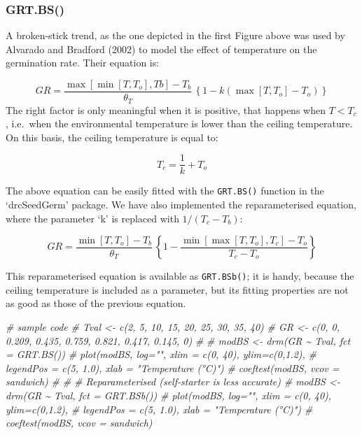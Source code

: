 \documentclass[
]{book}
\newenvironment{Shaded}{\begin{snugshade}}{\end{snugshade}}
\newcommand{\CommentTok}[1]{\textcolor[rgb]{0.56,0.35,0.01}{\textit{#1}}}
\begin{document}
\hypertarget{grt.bs}{%
\subsubsection{GRT.BS()}\label{grt.bs}}

A broken-stick trend, as the one depicted in the first Figure above was used by Alvarado and Bradford (2002) to model the effect of temperature on the germination rate. Their equation is:

\[GR = \frac{\max \left[\min \left[T,T_o \right], Tb \right] - T_b}{\theta_{T}} \, \left\{ 1 - k \left( \max \left[ T,T_o \right] - T_o \right) \right\}\]
The right factor is only meaningful when it is positive, that happens when \(T < T_c\), i.e.~when the environmental temperature is lower than the ceiling temperature. On this basis, the ceiling temperature is equal to:

\[ T_c = \frac{1}{k} + T_o\]

The above equation can be easily fitted with the \texttt{GRT.BS()} function in the `drcSeedGerm' package. We have also implemented the reparameterised equation, where the parameter `k' is replaced with \(1/(T_c - T_b)\):

\[GR = \frac{\min \left[T,T_o \right] - T_b}{\theta_{T}} \, \left\{ 1 - \frac {\min \left[\max \left[ T,T_o \right], T_c \right] - T_o}{T_c - T_o} \right\}\]

This reparameterised equation is available as \texttt{GRT.BSb()}; it is handy, because the ceiling temperature is included as a parameter, but its fitting properties are not as good as those of the previous equation.

\begin{Shaded}
\begin{Highlighting}[]
\CommentTok{\# sample code}
\CommentTok{\# Tval \textless{}{-} c(2, 5, 10, 15, 20, 25, 30, 35, 40)}
\CommentTok{\# GR \textless{}{-} c(0, 0, 0.209, 0.435, 0.759, 0.821, 0.417, 0.145, 0)}
\CommentTok{\# }
\CommentTok{\# modBS \textless{}{-} drm(GR \textasciitilde{} Tval, fct = GRT.BS())}
\CommentTok{\# plot(modBS, log="", xlim = c(0, 40), ylim=c(0,1.2),}
\CommentTok{\#      legendPos = c(5, 1.0), xlab = "Temperature (°C)")}
\CommentTok{\# coeftest(modBS, vcov = sandwich)}
\CommentTok{\# }
\CommentTok{\# \# Reparameterised (self{-}starter is less accurate)}
\CommentTok{\# modBS \textless{}{-} drm(GR \textasciitilde{} Tval, fct = GRT.BSb())}
\CommentTok{\# plot(modBS, log="", xlim = c(0, 40), ylim=c(0,1.2),}
\CommentTok{\#      legendPos = c(5, 1.0), xlab = "Temperature (°C)")}
\CommentTok{\# coeftest(modBS, vcov = sandwich)}
\end{Highlighting}
\end{Shaded}
\end{document}
